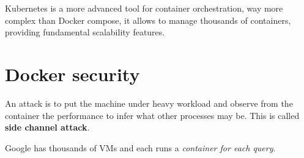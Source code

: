 Kubernetes is a more advanced tool for container orchestration, way more complex than Docker compose, it allows to manage thousands of containers, providing fundamental scalability features.

\section{Docker security}
An attack is to put the machine under heavy workload and observe from the container the performance to infer what other processes may be. This is called \textbf{side channel attack}.

Google has thousands of VMs and each runs a \textit{container for each query}.